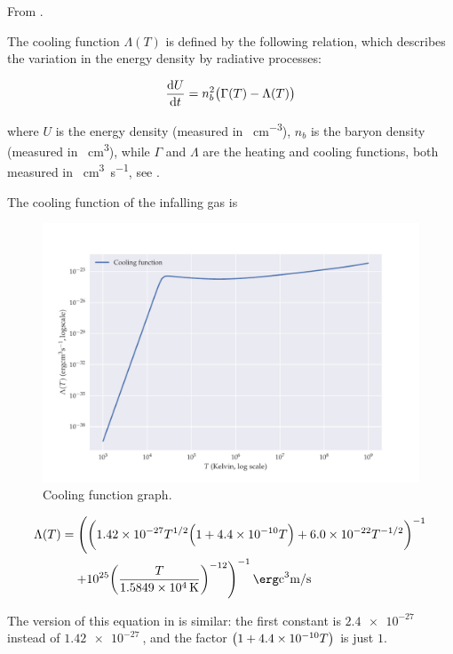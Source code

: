 \documentclass[main.tex]{subfiles}
\begin{document}
From \cite{NobiliTurollaZampieri:1991dec}.

The cooling function \(\Lambda (T)\) is defined by the following relation, which describes the variation in the energy density by radiative processes:

\begin{equation}
    \dv{U}{t} = n^2_b \qty(\Gamma(T) - \Lambda (T))
\end{equation}

where \(U\) is the energy density (measured in \si{\erg\per\cubic\centi\metre}), \(n_b\) is the baryon density (measured in \si{\per\cubic\centi\metre}), while \(\Gamma\) and \(\Lambda\) are the heating and cooling functions, both measured in \si{\erg\cubic\centi\metre\per\second}, see \cite[equation 1]{GnedinHollon:2012}.

The cooling function of the infalling gas is

\begin{figure}
    \centering
    \includegraphics[width=\textwidth]{figures/cooling_function.pdf}
    \caption{Cooling function graph.}
    \label{fig:cooling-function}
\end{figure}

\begin{equation}
    \begin{split}
    \Lambda (T) &= \left(
    \qty(
    \num{1.42e-27}T^{1/2} \qty(
    1 + \num{4.4e-10}T
    ) + \num{6.0e-22}T^{-1/2}
    )^{-1} \right. \\
    & \quad \left. + \num{e25} \qty(\frac{T}{\SI{1.5849e4}{K}})^{-12}
    \right)^{-1} \si{\erg\cubic\centi\metre\per\second}
    \end{split}
\end{equation}

The version of this equation in \textcite[equation 10]{StellingwerfBuff:1982} is similar: the first constant is \(\SI{2.4e-27}{} \) instead of \(\SI{1.42e-27}{} \), and the factor \(\qty(1 + \SI{4.4e-10}{}T)\) is just \(1\).
\end{document}
